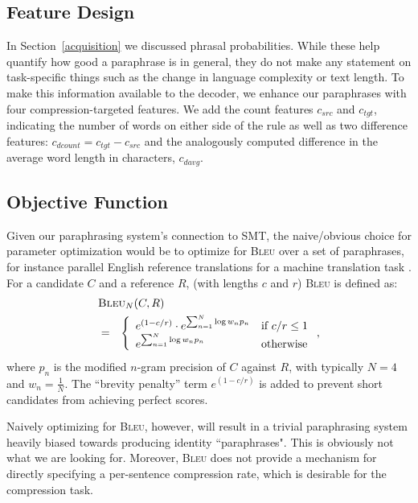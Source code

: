 \documentclass[11pt]{article}
\begin{document}
\subsection{Feature Design}\label{feat-design}
In Section~\ref{acquisition} we discussed phrasal
probabilities. While these help quantify how good a paraphrase is in
general, they do not make any statement on task-specific things such
as the change in language complexity or text length. To make this
information available to the decoder, we enhance our paraphrases with
four compression-targeted features. We add the count features
$c_{\mathit{src}}$ and $c_{\mathit{tgt}}$, indicating the number of
words on either side of the rule as well as two difference features:
$c_{\mathit{dcount}} = c_{\mathit{tgt}} - c_{\mathit{src}}$ and the
analogously computed difference in the average word length in
characters, $c_{\mathit{davg}}$.

\vspace{-.2cm}
\subsection{Objective Function}
\label{objective-fn}

Given our paraphrasing system's connection to SMT, the naive/obvious choice for parameter optimization would be to optimize for \textsc{Bleu} over a set of paraphrases, for instance parallel English reference translations for a machine translation task \cite{Madnani2007}.
 For a candidate $C$ and a reference $R$, (with
lengths $c$ and $r$) \textsc{Bleu} is defined as:\vspace{-0.2cm}
\begin{eqnarray}
  \lefteqn{ \textsc{Bleu}_{N} (C,R) } \nonumber \\
  &=& \left\{ \begin{array}{ll}
      e^{(1 - c/r)} \cdot
      e^{\sum_{n=1}^N\log w_n p_n} & \textrm{if
        $c/r \leq 1$} \nonumber \\ 
       e^{\sum_{n=1}^N\log w_n p_n} & \textrm{otherwise}
\end{array} \right. ,
\end{eqnarray}
where $p_n$ is the modified $n$-gram precision of $C$ against $R$,
with typically $N=4$ and $w_n=\frac{1}{N}$. The ``brevity penalty''
term $e^{(1 - c/r)}$ is added to prevent short candidates
from achieving perfect scores.

Naively optimizing for \textsc{Bleu}, however, will result in a trivial paraphrasing system heavily biased towards producing identity ``paraphrases".  This is obviously not what we are looking for. Moreover, \textsc{Bleu} does not provide a mechanism for directly specifying a per-sentence compression rate, which is desirable for the compression task.
\end{document}
